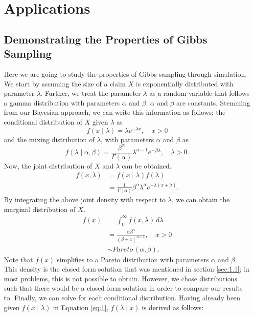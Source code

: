\documentclass[11pt, oneside]{article}
\begin{document}
\section{Applications}

\subsection{Demonstrating the Properties of Gibbs Sampling} \label{Demonstrating the Properties of Gibbs Sampling}

Here we are going to study the properties of Gibbs sampling through simulation. We start by assuming the size of a claim $X$ is exponentially distributed with parameter $\lambda$. Further, we treat the parameter $\lambda$ as a random variable that follows a gamma distribution with parameters $\alpha$ and $\beta$. $\alpha$ and $\beta$ are constants. Stemming from our Bayesian approach, we can write this information as follows:
the conditional distribution of $X$ given $\lambda$ as
\begin{equation}\label{eq:1}
f(x\mid\lambda) = \lambda e^{-\lambda x},\quad\mbox{$x>0$}
\end{equation}
and the mixing distribution of $\lambda$, with parameters $\alpha$ and $\beta$ as
\[
f(\lambda\mid\alpha,\beta) = \frac{\beta^\alpha}{\Gamma(\alpha)}\lambda^{\alpha-1}e^{-\beta\lambda},\quad \mbox{$\lambda>0$}.
\]
Now, the joint distribution of $X$ and $\lambda$ can be obtained.
\begin{align*}
f(x,\lambda) &= f(x\mid\lambda)f(\lambda)\\
&= \frac{1}{\Gamma(\alpha)}\beta^\alpha\lambda^\alpha e^{-\lambda(x+\beta)}.
\end{align*}
By integrating the above joint density with respect to $\lambda$, we can obtain the marginal distribution of $X$.
\begin{align*}
f(x) &= \int_0^\infty{f(x,\lambda)\,d\lambda}\\
&= \frac{\alpha\beta^\alpha}{(\beta+x)^{\alpha+1}},\quad\mbox{$x>0$}\\
&\sim Pareto\,(\alpha,\beta).
\end{align*}
Note that $f(x)$ simplifies to a Pareto distribution with parameters $\alpha$ and $\beta$. This density is the closed form solution that was mentioned in section \ref{sec:1.1}; in most problems, this is not possible to obtain. However, we chose distributions such that there would be a closed form solution in order to compare our results to. Finally, we can solve for each conditional distribution. Having already been given $f(x\mid\lambda)$ in Equation \ref{eq:1}, $f(\lambda\mid x)$ is derived as follows:
\end{document}
